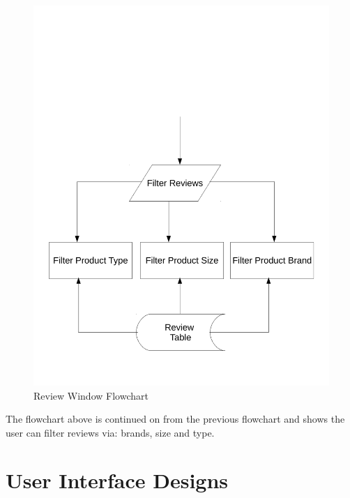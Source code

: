 \begin{figure}[H]
    \includegraphics[width=\textwidth]{./Design/ReviewFlowchart2.pdf}
    \caption{Review Window Flowchart} \label{fig:Review Flowchart}
\end{figure}


The flowchart above is continued on from the previous flowchart and shows the user can filter reviews via: brands, size and type. 


\section{User Interface Designs}

